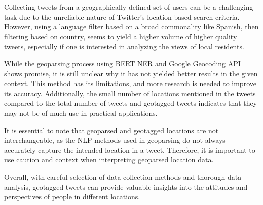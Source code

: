 Collecting tweets from a geographically-defined set of users can be a challenging task due to the unreliable nature of Twitter's location-based search criteria. However, using a language filter based on a broad commonality like Spanish, then filtering based on country, seems to yield a higher volume of higher quality tweets, especially if one is interested in analyzing the views of local residents.

While the geoparsing process using BERT NER and Google Geocoding API shows promise, it is still unclear why it has not yielded better results in the given context. This method has its limitations, and more research is needed to improve its accuracy. Additionally, the small number of locations mentioned in the tweets compared to the total number of tweets and geotagged tweets indicates that they may not be of much use in practical applications.

It is essential to note that geoparsed and geotagged locations are not interchangeable, as the NLP methods used in geoparsing do not always accurately capture the intended location in a tweet. Therefore, it is important to use caution and context when interpreting geoparsed location data.

Overall, with careful selection of data collection methods and thorough data analysis, geotagged tweets can provide valuable insights into the attitudes and perspectives of people in different locations.